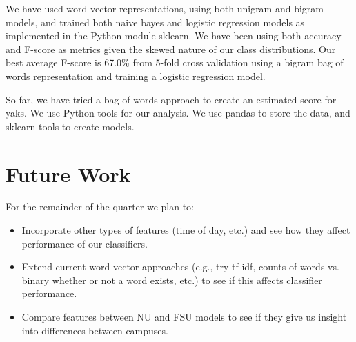 \documentclass{sigchi}
\begin{document}
We have used word vector representations, using both unigram and bigram models,
and trained both naive bayes and logistic regression models as implemented in
the Python module sklearn. We have been using both accuracy and F-score as
metrics given the skewed nature of our class distributions. Our best average
F-score is 67.0\% from 5-fold cross validation using a bigram bag of words
representation and training a logistic regression model.

So far, we have tried a bag of words approach to create an estimated score for
yaks. We use Python tools for our analysis. We use pandas to store the data, and
sklearn tools to create models.

\section{Future Work}

For the remainder of the quarter we plan to:
\begin{itemize}
\item Incorporate other types of features (time of day, etc.) and see how they
affect performance of our classifiers.
\item Extend current word vector approaches (e.g., try tf-idf, counts of words
vs. binary whether or not a word exists, etc.) to see if this affects classifier
performance.
\item Compare features between NU and FSU models to see if they give us
insight into differences between campuses.
\end{itemize}

%  
\end{document}
